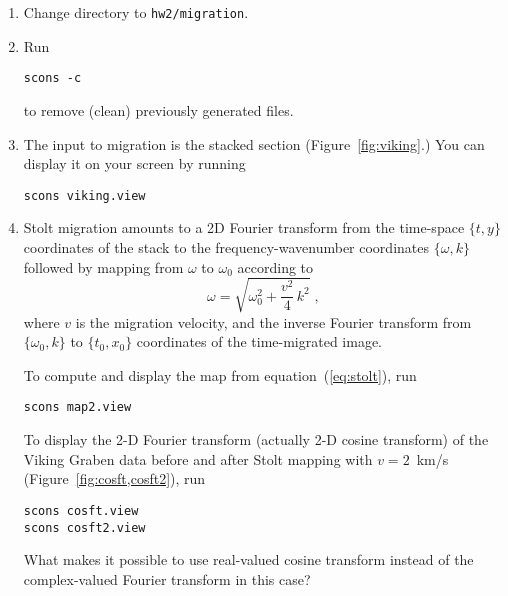 \begin{enumerate}          
\item Change directory to \texttt{hw2/migration}.
\item Run
\begin{verbatim}
scons -c
\end{verbatim}
to remove (clean) previously generated files.
\item The input to migration is the stacked section (Figure~\ref{fig:viking}.) You can display it on your screen by running 
\begin{verbatim}
scons viking.view
\end{verbatim}


\item Stolt migration amounts to a 2D Fourier transform from the time-space $\{t,y\}$ coordinates of the stack to the frequency-wavenumber coordinates $\{\omega,k\}$ followed by mapping from $\omega$ to $\omega_0$ according to
\begin{equation}
\label{eq:stolt}
\omega = \sqrt{\omega_0^2 + \frac{v^2}{4}\,k^2}\;,
\end{equation}
where $v$ is the migration velocity, and the inverse Fourier transform
from $\{\omega_0,k\}$ to $\{t_0,x_0\}$ coordinates of the
time-migrated image.

To compute and display the map from equation~(\ref{eq:stolt}), run
\begin{verbatim}
scons map2.view
\end{verbatim}

To display the 2-D Fourier transform (actually 2-D cosine transform)
of the Viking Graben data before and after Stolt mapping with
$v=2$~km/s (Figure~\ref{fig:cosft,cosft2}), run
\begin{verbatim}
scons cosft.view
scons cosft2.view
\end{verbatim}


What makes it possible to use real-valued cosine transform instead of
the complex-valued Fourier transform in this case?

\answer{%

}


\end{enumerate}
